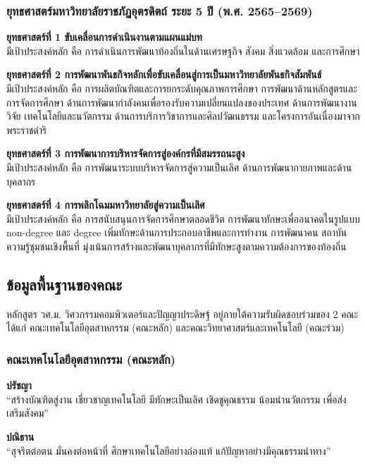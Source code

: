 \subsubsection*{ยุทธศาสตร์มหาวิทยาลัยราชภัฏอุตรดิตถ์ ระยะ 5 ปี (พ.ศ. 2565--2569)}

\textbf{ยุทธศาสตร์ที่ 1 ขับเคลื่อนการดำเนินงานตามแผนแม่บท}\\
มีเป้าประสงค์หลัก คือ การดำเนินการพัฒนาท้องถิ่นในด้านเศรษฐกิจ สังคม สิ่งแวดล้อม และการศึกษา

\textbf{ยุทธศาสตร์ที่ 2 การพัฒนาพันธกิจหลักเพื่อขับเคลื่อนสู่การเป็นมหาวิทยาลัยพันธกิจสัมพันธ์}\\
มีเป้าประสงค์หลัก คือ การผลิตบัณฑิตและการยกระดับคุณภาพการศึกษา การพัฒนาด้านหลักสูตรและการจัดการศึกษา ด้านการพัฒนากำลังคนเพื่อรองรับความเปลี่ยนแปลงของประเทศ ด้านการพัฒนางานวิจัย เทคโนโลยีและนวัตกรรม ด้านการบริการวิชาการและศิลปวัฒนธรรม และโครงการอันเนื่องมาจากพระราชดำริ

\textbf{ยุทธศาสตร์ที่ 3 การพัฒนาการบริหารจัดการสู่องค์กรที่มีสมรรถนะสูง}\\
มีเป้าประสงค์หลัก คือ การพัฒนาระบบบริหารจัดการสู่ความเป็นเลิศ ด้านการพัฒนากายภาพและด้านบุคลากร

\textbf{ยุทธศาสตร์ที่ 4 การพลิกโฉมมหาวิทยาลัยสู่ความเป็นเลิศ}\\
มีเป้าประสงค์หลัก คือ การสนับสนุนการจัดการศึกษาตลอดชีวิต การพัฒนาทักษะเพื่ออนาคตในรูปแบบ non-degree และ degree เพิ่มทักษะด้านการประกอบอาชีพและการทำงาน การพัฒนาคน สถาบันความรู้ชุมชนเชิงพื้นที่ มุ่งเน้นการสร้างและพัฒนาบุคลากรที่มีทักษะสูงตามความต้องการของท้องถิ่น

\subsection{ข้อมูลพื้นฐานของคณะ}

หลักสูตร วศ.ม. วิศวกรรมคอมพิวเตอร์และปัญญาประดิษฐ์ อยู่ภายใต้ความรับผิดชอบร่วมของ
2 คณะ ได้แก่ คณะเทคโนโลยีอุตสาหกรรม (คณะหลัก) และคณะวิทยาศาสตร์และเทคโนโลยี (คณะร่วม)

\subsubsection*{คณะเทคโนโลยีอุตสาหกรรม (คณะหลัก)}

\textbf{ปรัชญา}\\
``สร้างบัณฑิตสู่งาน เชี่ยวชาญเทคโนโลยี มีทักษะเป็นเลิศ เชิดชูคุณธรรม น้อมนำนวัตกรรม เพื่อส่งเสริมสังคม''

\textbf{ปณิธาน}\\
``สุจริตต่อตน มั่นคงต่อหน้าที่ ศึกษาเทคโนโลยีอย่างถ่องแท้ แก้ปัญหาอย่างมีคุณธรรมนำทาง''

